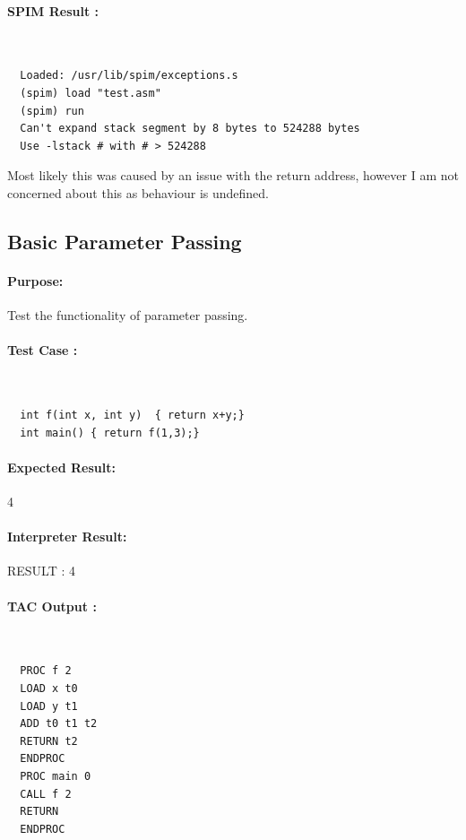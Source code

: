 \documentclass[12pt]{article}
\begin{document}
\paragraph{SPIM Result :}~\\
\begin{lstlisting}
  Loaded: /usr/lib/spim/exceptions.s
  (spim) load "test.asm"
  (spim) run
  Can't expand stack segment by 8 bytes to 524288 bytes
  Use -lstack # with # > 524288
\end{lstlisting}
Most likely this was caused by an issue with the return address, however I am not concerned about this as behaviour is undefined.
\subsection{Basic Parameter Passing}
\paragraph{Purpose:}Test the functionality of parameter passing.
\paragraph{Test Case :}~\\
\begin{lstlisting}
  int f(int x, int y)  { return x+y;}
  int main() { return f(1,3);}
\end{lstlisting}
\paragraph{Expected Result:}4
\paragraph{Interpreter Result:}RESULT : 4
\paragraph{TAC Output : }~\\
\begin{lstlisting}
  PROC f 2
  LOAD x t0
  LOAD y t1
  ADD t0 t1 t2
  RETURN t2
  ENDPROC
  PROC main 0
  CALL f 2
  RETURN
  ENDPROC
\end{lstlisting}
\end{document}

